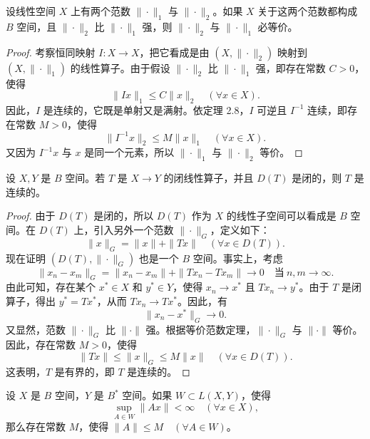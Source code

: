 \documentclass[lang=cn,newtx,10pt,scheme=chinese,thmcnt=chapter]{elegantbook}
\begin{document}
\begin{corollary}[等价范数定理]
设线性空间 $X$ 上有两个范数 $\|\cdot\|_1$ 与 $\|\cdot\|_2$。如果 $X$ 关于这两个范数都构成 $B$ 空间，且 $\|\cdot\|_2$ 比 $\|\cdot\|_1$ 强，则 $\|\cdot\|_2$ 与 $\|\cdot\|_1$ 必等价。
\end{corollary}

\begin{proof}
考察恒同映射 $I: X \to X$，把它看成是由 $(X, \|\cdot\|_2)$ 映射到 $(X, \|\cdot\|_1)$ 的线性算子。由于假设 $\|\cdot\|_2$ 比 $\|\cdot\|_1$ 强，即存在常数 $C > 0$，使得
\[
\|I x\|_1 \leqslant C \|x\|_2 \quad (\forall x \in X).
\]
因此，$I$ 是连续的，它既是单射又是满射。依定理 2.8，$I$ 可逆且 $I^{-1}$ 连续，即存在常数 $M > 0$，使得
\[
\|I^{-1} x\|_2 \leqslant M \|x\|_1 \quad (\forall x \in X).
\]
又因为 $I^{-1} x$ 与 $x$ 是同一个元素，所以 $\|\cdot\|_1$ 与 $\|\cdot\|_2$ 等价。

\end{proof}
\begin{theorem}[闭图像定理]
设 $X, Y$ 是 $B$ 空间。若 $T$ 是 $X \to Y$ 的闭线性算子，并且 $D(T)$ 是闭的，则 $T$ 是连续的。
\end{theorem}

\begin{proof}
由于 $D(T)$ 是闭的，所以 $D(T)$ 作为 $X$ 的线性子空间可以看成是 $B$ 空间。在 $D(T)$ 上，引入另外一个范数 $\|\cdot\|_G$，定义如下：
\[
\|x\|_G = \|x\| + \|T x\| \quad (\forall x \in D(T)).
\]
现在证明 $\left(D(T), \|\cdot\|_G\right)$ 也是一个 $B$ 空间。事实上，考虑
\[
\|x_n - x_m\|_G = \|x_n - x_m\| + \|T x_n - T x_m\| \to 0 \quad \text{当} \ n, m \to \infty.
\]
由此可知，存在某个 $x^* \in X$ 和 $y^* \in Y$，使得 $x_n \to x^*$ 且 $T x_n \to y^*$。由于 $T$ 是闭算子，得出 $y^* = T x^*$，从而 $T x_n \to T x^*$。因此，有
\[
\|x_n - x^*\|_G \to 0.
\]
又显然，范数 $\|\cdot\|_G$ 比 $\|\cdot\|$ 强。根据等价范数定理，$\|\cdot\|_G$ 与 $\|\cdot\|$ 等价。因此，存在常数 $M > 0$，使得
\[
\|T x\| \leqslant \|x\|_G \leqslant M \|x\| \quad (\forall x \in D(T)).
\]
这表明，$T$ 是有界的，即 $T$ 是连续的。
\end{proof}

\begin{theorem}[共鸣定理或一致有界定理]
设 $X$ 是 $B$ 空间，$Y$ 是 $B^*$ 空间。如果 $W \subset L(X, Y)$，使得
\[
\sup_{A \in W} \|A x\| < \infty \quad (\forall x \in X),
\]
那么存在常数 $M$，使得 $\|A\| \leqslant M \quad (\forall A \in W)$。
\end{theorem}
\end{document}
